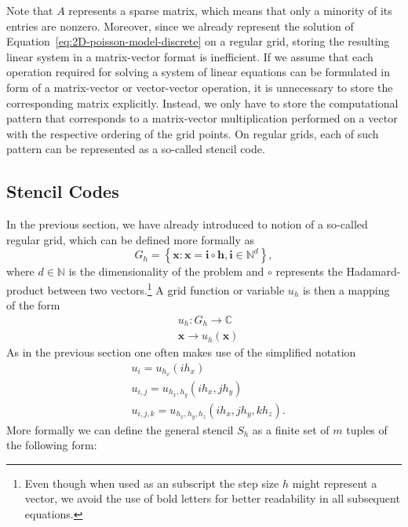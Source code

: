 Note that $A$ represents a sparse matrix, which means that only a minority of its entries are nonzero.
Moreover, since we already represent the solution of Equation~\ref{eq:2D-poisson-model-discrete} on a regular grid, storing the resulting linear system in a matrix-vector format is inefficient.
If we assume that each operation required for solving a system of linear equations can be formulated in form of a matrix-vector or vector-vector operation, it is unnecessary to store the corresponding matrix explicitly.
Instead, we only have to store the computational pattern that corresponds to a matrix-vector multiplication performed on a vector with the respective ordering of the grid points.
On regular grids, each of such pattern can be represented as a so-called stencil code.
\subsection{Stencil Codes}
\label{subsec:stencil-codes}
In the previous section, we have already introduced to notion of a so-called regular grid, which can be defined more formally as
\begin{equation}
	G_{h} = \left\{ \bm{x} : \bm{x} = \bm{i} \circ \bm{h}, \bm{i} \in \mathbb{N}^d \right\},
\end{equation}
where $d \in \mathbb{N}$ is the dimensionality of the problem and $\circ$ represents the Hadamard-product between two vectors.\footnote{Even though when used as an subscript the step size $h$ might represent a vector, we avoid the use of bold letters for better readability in all subsequent equations.}
A grid function or variable $u_h$ is then a mapping of the form
\begin{equation}
	\begin{split}
		& u_h : G_{h}\to \mathbb{C} \\
		& \bm{x} \to u_h(\bm{x})
	\end{split}
\end{equation}
As in the previous section one often makes use of the simplified notation
\begin{equation}
	\begin{split}
		 & u_i = u_{h_x}(i h_x) \\
		& u_{i,j} = u_{h_x, h_y}(i h_x, j h_y) \\
		& u_{i,j,k} = u_{h_x, h_y, h_z}(i h_x, j h_y, k h_z).
	\end{split}
\end{equation}
More formally we can define the general stencil $S_h$ as a finite set of $m$ tuples of the following form:

